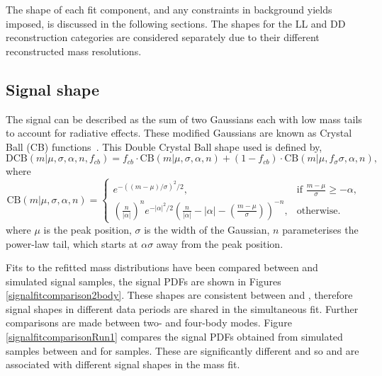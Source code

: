 The shape of each fit component, and any constraints in background yields imposed, is discussed in the following sections. The shapes for the LL and DD \KS reconstruction categories are considered separately due to their different reconstructed \Bm mass resolutions.

\subsection{Signal shape}
\label{sec:massfit:signal}

The signal can be described as the sum of two Gaussians each with low mass tails to account for radiative effects. These modified Gaussians are known as Crystal Ball (CB) functions~\cite{Skwarnicki:1986xj}. This Double Crystal Ball shape used is defined by,
\begin{equation}
\mathrm{DCB}(m| \mu,\sigma,\alpha,n,f_{cb}) = f_{cb} \cdot \mathrm{CB}(m| \mu,\sigma,\alpha,n) + (1-f_{cb}) \cdot \mathrm{CB}(m|\mu,f_{\sigma}\sigma,\alpha,n),
\label{DCBshape}
\end{equation}
where
\begin{equation*}
  \mathrm{CB}(m| \mu,\sigma,\alpha,n)=
\begin{cases}
    e^{-((m-\mu)/ \sigma)^2/2},                                   & \text{if } \frac{m-\mu}{\sigma} \geq - \alpha, \\
   \left ( \frac{n}{|\alpha|} \right ) ^n e^{-|\alpha|^2/2} \left ( \frac{n}{|\alpha|} - |\alpha| - \left ( \frac{m-\mu}{\sigma} \right ) \right ) ^{-n} ,    & \text{otherwise.}
\end{cases}
\end{equation*}
where $\mu$ is the peak position, $\sigma$ is the width of the Gaussian, $n$ parameterises the power-law tail, which starts at $\alpha\sigma$ away from the peak position.

Fits to the refitted \B mass distributions have been compared between \runone and \runtwo simulated signal samples, the signal PDFs are shown in Figures \ref{signalfitcomparison2body}. These shapes are consistent between \runone and \runtwo, therefore signal shapes in different data periods are shared in the simultaneous fit. Further comparisons are made between two- and four-body modes. Figure \ref{signalfitcomparisonRun1} compares the signal PDFs obtained from simulated samples between \kpi and \kpipipi for \runone samples. These are significantly different and so \kpi and \kpipipi are associated with different signal shapes in the mass fit.

